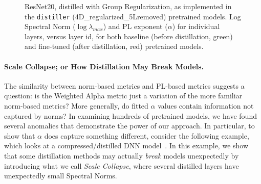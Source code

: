 \begin{figure}[t]
   \centering
   \qquad
   \caption{%
            ResNet20, distilled with Group Regularization, as implemented in the \texttt{distiller} (4D\_regularized\_5Lremoved) pretrained models.  
            Log Spectral Norm ($\log\lambda_{max}$) and PL exponent ($\alpha$) for individual layers, versus layer id, for both baseline (before distillation, green) and fine-tuned (after distillation, red) pretrained models. 
           }
   \label{fig:resnet204D5L}
\end{figure}


\vspace{-1mm}
\paragraph{Scale Collapse; or How Distillation May Break Models.}

The similarity between norm-based metrics and PL-based metrics suggests a question: is the Weighted Alpha metric just a variation of the more familiar norm-based metrics?  %
More generally, do fitted $\alpha$ values contain information not captured by norms? 
In examining hundreds of pretrained models, we have found several anomalies that demonstrate the power of our approach.
In particular, to show that $\alpha$ does capture something different, consider the following example, which looks at a compressed/distilled DNN model~\cite{CWZZ17_TR}.
In this example, we show that some distillation methods may actually \emph{break} models unexpectedly by introducing what we call \emph{Scale Collapse}, where several distilled layers have unexpectedly small Spectral Norms.

